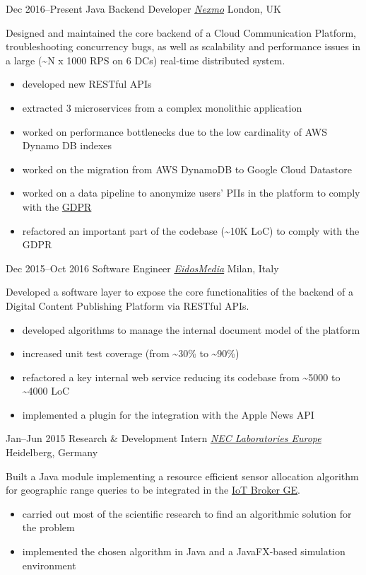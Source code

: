\begin{entrylist}
\entry
{Dec 2016--Present}
{Java Backend Developer {\normalfont \emph{\href{https://www.nexmo.com/}{Nexmo}}}}
{London, UK}
{Designed and maintained the core backend of a Cloud Communication Platform, troubleshooting concurrency bugs, as well as scalability and performance issues in a large (\textasciitilde N x 1000 RPS on 6 DCs) real-time distributed system.
\vspace{-.2cm}
\begin{itemize}[leftmargin=.6cm]
	\item developed new RESTful APIs  
	\item extracted 3 microservices from a complex monolithic application
	\item worked on performance bottlenecks due to the low cardinality of AWS Dynamo DB indexes
	\item worked on the migration from AWS DynamoDB to Google Cloud Datastore
	\item worked on a data pipeline to anonymize users' PIIs in the platform to comply with the \href{https://en.wikipedia.org/wiki/General_Data_Protection_Regulation}{GDPR}
	\item refactored an important part of the codebase (\textasciitilde 10K LoC) to comply with the GDPR
\end{itemize}
}

\entry
{Dec 2015--Oct 2016}
{Software Engineer {\normalfont \emph{\href{https://www.eidosmedia.com/}{EidosMedia}}}}
{Milan, Italy}
{Developed a software layer to expose the core functionalities of the backend of a Digital Content Publishing Platform via RESTful APIs.  
\vspace{-.2cm}
\begin{itemize}[leftmargin=.6cm] 
	\item developed algorithms to manage the internal document model of the platform
	\item increased unit test coverage (from \textasciitilde 30\% to \textasciitilde 90\%)
	\item refactored a key internal web service reducing its codebase from \textasciitilde 5000 to \textasciitilde 4000 LoC
	\item implemented a plugin for the integration with the Apple News API 
\end{itemize}
}

\entry
{Jan--Jun 2015}
{Research \& Development Intern {\normalfont \emph{\href{https://uk.nec.com/}{NEC Laboratories Europe}}}}
{Heidelberg, Germany}
{Built a Java module implementing a resource efficient sensor allocation algorithm for geographic range queries to be integrated in the \href{https://github.com/Aeronbroker/Aeron}{IoT Broker GE}.
\vspace{-.2cm}
\begin{itemize}[leftmargin=.6cm]
	\item carried out most of the scientific research to find an algorithmic solution for the problem
	\item implemented the chosen algorithm in Java and a JavaFX-based simulation environment
\end{itemize}
}


\end{entrylist}

